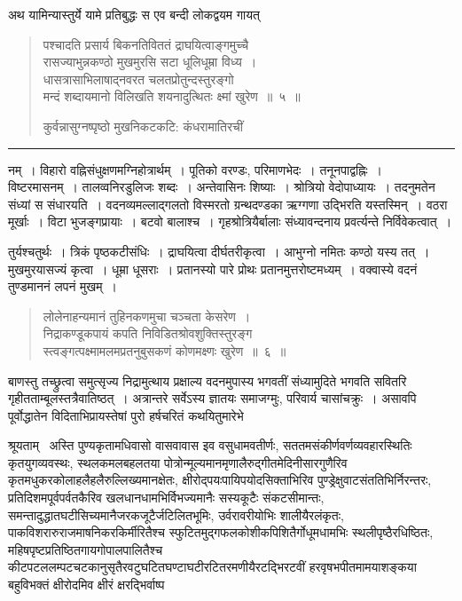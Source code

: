 \documentclass[11pt, openany]{book}
\begin{document}
अथ यामिन्यास्तुर्ये यामे प्रतिबुद्धः स एव बन्दी लोकद्वयम गायत् \textendash\ 

\vspace{-5mm}
\begin{quote}
{\ha पश्चादति प्रसार्य बिकनतिविततं द्राघयित्वाङ्गमुच्चै\\
रासज्याभुन्नकण्ठो मुखमुरसि सटा धूलिधूम्रा विध्य~।\\
धासत्रासाभिलाषाद्नवरत चलतप्रोतुन्दस्तुरङ्गो\\
मन्दं शब्दायमानो विलिखति शयनादुत्थितः क्ष्मां खुरेण~॥~५~॥

कुर्वन्नासुग्नष्पृष्ठो मुखनिकटकटि: कंधरामातिरचीं}
\end{quote}

\vspace{2mm}
\hrule

\noindent
नम्~। विहारो वह्निसंधुक्षणमग्निहोत्रार्थम्~। पूतिको वरण्डः, परिमाणभेदः~। तनूनपाद्वह्निः~। विष्टरमासनम्~। तालव्वनिरडुलिजः शब्दः~। अन्तेवासिनः शिष्याः~। श्रोत्रियो वेदोपाध्यायः~। तदनुमतेन संध्यां स संधारयति~। वदनव्यमल्लाद्गलतो विस्मरतो ग्रन्थदण्डका ऋग्गणा उद्भिरति यस्तस्मिन्~। वठरा मूर्खाः~। विटा भुजङ्गप्रायाः~। बटवो बालाश्च~। गृहश्रोत्रियैर्बालाः संध्यावन्दनाय प्रवर्त्यन्ते निर्विवेकत्वात्~।

तुर्यश्चतुर्थः~। त्रिकं पृष्ठकटीसंधिः~। द्राघयित्वा दीर्घतरीकृत्वा~। आभुग्नो नमितः कण्ठो यस्य तत्~। मुखमुरयासज्यं कृत्वा~। धूम्रा धूसराः~। प्रतानस्यो पारे प्रोथः प्रतानमुत्तरोष्टमध्यम्~। {\qt वक्वास्ये वदनं तुण्डमाननं लपनं मुखम्}~।


\newpage
\lfoot{}

\begin{quote}
{\ha लोलेनाहन्यमानं तुहिनकणमुचा चञ्चता केसरेण~।\\
निद्राकण्डूकपायं कपति निविडितश्रोवशुक्तिस्तुरङ्ग\textendash \\
स्त्वङ्गत्पक्ष्मामलमप्रतनुबुसकणं कोणमक्ष्णः खुरेण~॥~६~॥}
\end{quote}

\vspace{-5mm}
\noindent
बाणस्तु तच्छ्रुत्वा समुत्सृज्य निद्रामुत्थाय प्रक्षाल्य वदनमुपास्य भगवतीं संध्यामुदिते भगवति सवितरि गृहीतताम्बूलस्तत्रैवातिष्ठत्~। अत्रान्तरे सर्वेऽस्य ज्ञातयः समाजग्मुः, परिवार्य चासांचक्रुः~। असावपि पूर्वोद्धातेन विदिताभिप्रायस्तेषां पुरो हर्षचरितं कथयितुमारेभे \textendash\ 

श्रूयताम् \textendash\ अस्ति पुण्यकृतामधिवासो वासवावास इव वसुधामवतीर्णः, सततमसंकीर्णवर्णव्यवहारस्थितिः कृतयुगव्यवस्थः, स्थलकमलबहलतया पोत्रोन्मूल्यमानमृणालैरुद्गीतमेदिनीसारगुणैरिव कृतमधुकरकोलाहलैहलैरुल्लिख्यमानक्षेतः, क्षीरोद्पयःपायिपयोदसिक्ताभिरिव पुण्ड्रेक्षुवाटसंततिभिर्निरन्तरः, प्रतिदिशमपूर्वपर्वतकैरिव खलधानधामभिर्विभज्यमानैः सस्यकूटैः संकटसीमान्तः, समन्तादुद्धातघटीसिच्यमानैजरकजूटैर्जटिलितभूमिः, उर्वरावरीयोभिः शालीयैरलंकृतः, पाकविशरारुराजमाषनिकरकिर्मीरितैश्च स्फुटितमुद्गफलकोशीकपिशितैर्गोधूमधामभिः स्थलीपृष्ठैरधिष्ठितः, महिषपृष्टप्रतिष्ठितगायगोपालपालितैश्च कीटपटललम्पटचटकानुसृतैरवटुघटितघण्टाघटीरटितरमणीयैरटद्भिरटवीं हरवृषभपीतमामयाशङ्कया बहुविभक्तं क्षीरोदमिव क्षीरं क्षरद्भिर्वाष्प\textendash
\end{document}
